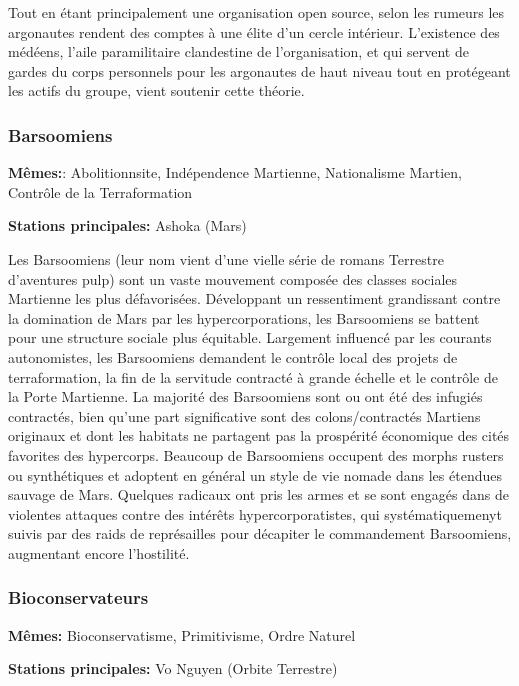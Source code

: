 Tout en étant principalement une organisation open source, selon les rumeurs les argonautes rendent des comptes à une élite d'un cercle intérieur. L'existence des médéens, l'aile paramilitaire clandestine de l'organisation, et qui servent de gardes du corps personnels pour les argonautes de haut niveau tout en protégeant les actifs du groupe, vient soutenir cette théorie. 

\subsubsection{Barsoomiens} \label{sec:barsoomians} 

\textbf{Mêmes:}: Abolitionnsite, Indépendence Martienne, Nationalisme Martien, Contrôle de la Terraformation 

\textbf{Stations principales:} Ashoka (Mars) 

Les Barsoomiens (leur nom vient d'une vielle série de romans Terrestre d'aventures pulp) sont un vaste mouvement composée des classes sociales Martienne les plus défavorisées. Développant un ressentiment grandissant contre la domination de Mars par les hypercorporations, les Barsoomiens se battent pour une structure sociale plus équitable. Largement influencé par les courants autonomistes, les Barsoomiens demandent le contrôle local des projets de terraformation, la fin de la servitude contracté à grande échelle et le contrôle de la Porte Martienne. La majorité des Barsoomiens sont ou ont été des infugiés contractés, bien qu'une part significative sont des colons/contractés Martiens originaux et dont les habitats ne partagent pas la prospérité économique des cités favorites des hypercorps. Beaucoup de Barsoomiens occupent des morphs rusters ou synthétiques et adoptent en général un style de vie nomade dans les étendues sauvage de Mars. Quelques radicaux ont pris les armes et se sont engagés dans de violentes attaques contre des intérêts hypercorporatistes, qui systématiquemenyt suivis par des raids de représailles pour décapiter le commandement Barsoomiens, augmentant encore l'hostilité. 

\subsubsection{Bioconservateurs} \label{sec:bioconservatives} 

\textbf{Mêmes:} Bioconservatisme, Primitivisme, Ordre Naturel 

\textbf{Stations principales:} Vo Nguyen (Orbite Terrestre) 

